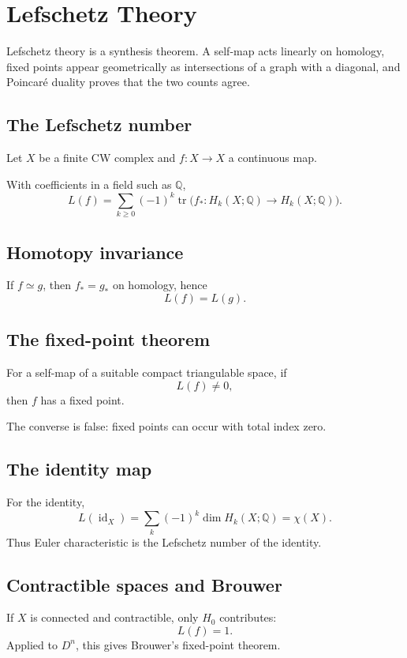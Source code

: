 
\chapter{Lefschetz Theory}
\label{ch:viii35-lefschetz-theory}

Lefschetz theory is a synthesis theorem.  A self-map acts linearly on homology,
fixed points appear geometrically as intersections of a graph with a diagonal,
and Poincaré duality proves that the two counts agree.

\section{The Lefschetz number}
Let $X$ be a finite CW complex and $f:X\to X$ a continuous map.

\begin{definition}
\label{def:viii35-lefschetz-number}
With coefficients in a field such as $\mathbb Q$,
\[
L(f)
=
\sum_{k\ge0}
(-1)^k
\operatorname{tr}
\bigl(f_*:H_k(X;\mathbb Q)\to H_k(X;\mathbb Q)\bigr).
\]
\end{definition}

\section{Homotopy invariance}
If $f\simeq g$, then $f_*=g_*$ on homology, hence
\[
L(f)=L(g).
\]

\section{The fixed-point theorem}
\begin{theorem}
\label{thm:viii35-lefschetz-fixed-point}
For a self-map of a suitable compact triangulable space, if
\[
L(f)\ne0,
\]
then $f$ has a fixed point.
\end{theorem}

The converse is false: fixed points can occur with total index zero.

\section{The identity map}
For the identity,
\[
L(\operatorname{id}_X)
=
\sum_k(-1)^k\dim H_k(X;\mathbb Q)
=
\chi(X).
\]
Thus Euler characteristic is the Lefschetz number of the identity.

\section{Contractible spaces and Brouwer}
If $X$ is connected and contractible, only $H_0$ contributes:
\[
L(f)=1.
\]
Applied to $D^n$, this gives Brouwer's fixed-point theorem.

